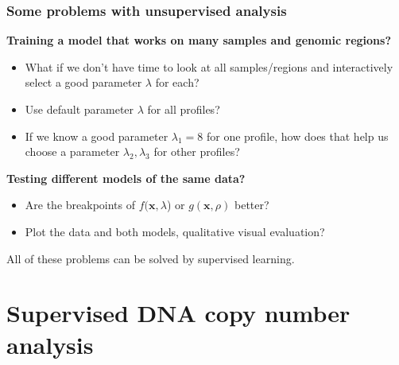\documentclass{beamer}
\begin{document}
\begin{frame}
  \frametitle{Some problems with unsupervised analysis}
  \textbf{Training a model that works on many samples and genomic
    regions?} 
  \begin{itemize}
  \item What if we don't have time to look at all samples/regions and
      interactively select a good parameter $\lambda$ for each?
  \item Use default parameter $\lambda$ for all profiles?
  \item If we know a good parameter $\lambda_1=8$ for one profile, how
    does that help us choose a parameter $\lambda_2, \lambda_3$ for
    other profiles?
  \end{itemize}
  \textbf{Testing different models of the same data?} 
    \begin{itemize}
    \item   Are the breakpoints of $f(\mathbf x, \lambda$) or
  $g(\mathbf x, \rho)$ better?
    \item Plot the data and both models, qualitative visual evaluation?
    \end{itemize}
  All of these problems can be solved by supervised learning.
\end{frame}

\section{Supervised DNA copy number analysis}
\end{document}
